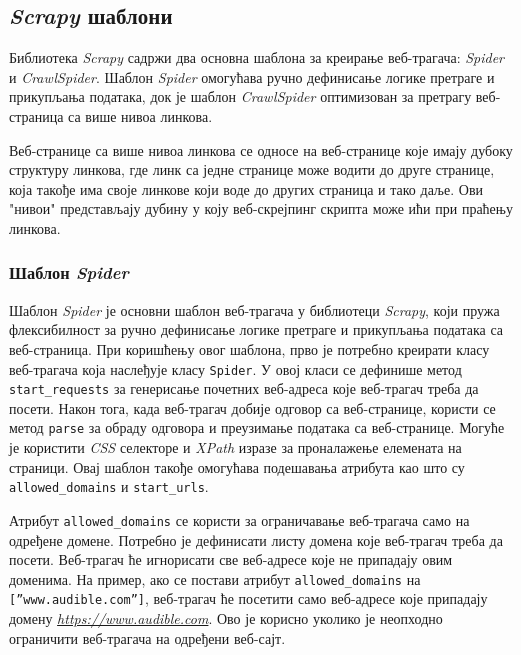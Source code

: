 \documentclass[12pt,oneside]{memoir}
\begin{document}
\subsection{\textit{Scrapy} шаблони}
Библиотека \textit{Scrapy} садржи два основна шаблона за креирање веб-трагача: \textit{Spider} и \textit{CrawlSpider}. Шаблон \textit{Spider} омогућава ручно дефинисање логике претраге и прикупљања података, док је шаблон \textit{CrawlSpider} оптимизован за претрагу веб-страница са више нивоа линкова.

Веб-странице са више нивоа линкова се односе на веб-странице које имају дубоку структуру линкова, где линк са једне странице може водити до друге странице, која такође има своје линкове који воде до других страница и тако даље. Ови "нивои" представљају дубину у коју веб-скрејпинг скрипта може ићи при праћењу линкова.

\subsubsection{Шаблон \textit{Spider}}
Шаблон \textit{Spider} је основни шаблон веб-трагача у библиотеци \textit{Scrapy}, који пружа флексибилност за ручно дефинисање логике претраге и прикупљања података са веб-страница. При коришћењу овог шаблона, прво је потребно креирати класу веб-трагача која наслеђује класу \texttt{Spider}. У овој класи се дефинише метод \texttt{start\_requests} за генерисање почетних веб-адреса које веб-трагач треба да посети. Након тога, када веб-трагач добије одговор са веб-странице, користи се метод \texttt{parse} за обраду одговора и преузимање података са веб-странице. Могуће је користити \textit{CSS} селекторе и \textit{XPath} изразе за проналажење елемената на страници. Овај шаблон такође омогућава подешавања атрибута као што су \texttt{allowed\_domains} и \texttt{start\_urls}.

Атрибут \texttt{allowed\_domains} се користи за ограничавање веб-трагача само на одређене домене. Потребно је дефинисати листу домена које веб-трагач треба да посети. Веб-трагач ће игнорисати све веб-адресе које не припадају овим доменима. На пример, ако се постави атрибут \texttt{allowed\_domains} на \texttt{[''www.audible.com'']}, веб-трагач ће посетити само веб-адресе које припадају домену \textit{\href{https://www.audible.com}{https://www.audible.com}}. Ово је корисно уколико је неопходно ограничити веб-трагача на одређени веб-сајт.
\end{document}
